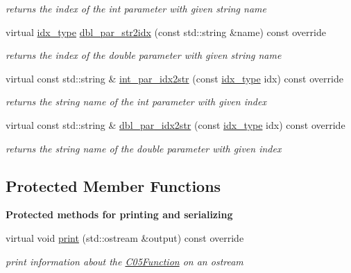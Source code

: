 \begin{Indent}
\begin{DoxyCompactItemize}
\begin{DoxyCompactList}\small\item\em returns the index of the int parameter with given string name \end{DoxyCompactList}\item 
virtual \mbox{\hyperlink{class_s_m_spp__di__unipi__it_1_1_thin_compute_interface_aa3d710629ad8c434286726ad810c3b47}{idx\+\_\+type}} \mbox{\hyperlink{class_s_m_spp__di__unipi__it_1_1_c05_function_a6d353ac3d1200d9bea89235da61bc4f3}{dbl\+\_\+par\+\_\+str2idx}} (const std\+::string \&name) const override
\begin{DoxyCompactList}\small\item\em returns the index of the double parameter with given string name \end{DoxyCompactList}\item 
virtual const std\+::string \& \mbox{\hyperlink{class_s_m_spp__di__unipi__it_1_1_c05_function_a61e973f39747f63b8f56d97cc62e32ce}{int\+\_\+par\+\_\+idx2str}} (const \mbox{\hyperlink{class_s_m_spp__di__unipi__it_1_1_thin_compute_interface_aa3d710629ad8c434286726ad810c3b47}{idx\+\_\+type}} idx) const override
\begin{DoxyCompactList}\small\item\em returns the string name of the int parameter with given index \end{DoxyCompactList}\item 
virtual const std\+::string \& \mbox{\hyperlink{class_s_m_spp__di__unipi__it_1_1_c05_function_a93f1297e7910e91cc18b303376191026}{dbl\+\_\+par\+\_\+idx2str}} (const \mbox{\hyperlink{class_s_m_spp__di__unipi__it_1_1_thin_compute_interface_aa3d710629ad8c434286726ad810c3b47}{idx\+\_\+type}} idx) const override
\begin{DoxyCompactList}\small\item\em returns the string name of the double parameter with given index \end{DoxyCompactList}\end{DoxyCompactItemize}
\end{Indent}
\subsection*{Protected Member Functions}
\begin{Indent}\textbf{ Protected methods for printing and serializing}\par
\begin{DoxyCompactItemize}
\item 
virtual void \mbox{\hyperlink{class_s_m_spp__di__unipi__it_1_1_c05_function_a59a9fcbf8f9f86d348344b2073644b0e}{print}} (std\+::ostream \&output) const override
\begin{DoxyCompactList}\small\item\em print information about the \mbox{\hyperlink{class_s_m_spp__di__unipi__it_1_1_c05_function}{C05\+Function}} on an ostream \end{DoxyCompactList}\end{DoxyCompactItemize}
\end{Indent}
